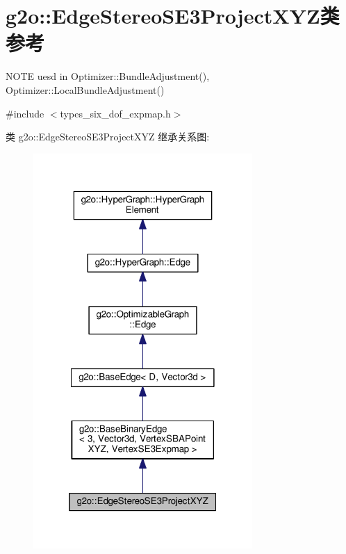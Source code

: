 \hypertarget{classg2o_1_1EdgeStereoSE3ProjectXYZ}{\section{g2o\-:\-:Edge\-Stereo\-S\-E3\-Project\-X\-Y\-Z类 参考}
\label{classg2o_1_1EdgeStereoSE3ProjectXYZ}
}


N\-O\-T\-E uesd in Optimizer\-::\-Bundle\-Adjustment(), Optimizer\-::\-Local\-Bundle\-Adjustment()  




{\ttfamily \#include $<$types\-\_\-six\-\_\-dof\-\_\-expmap.\-h$>$}



类 g2o\-:\-:Edge\-Stereo\-S\-E3\-Project\-X\-Y\-Z 继承关系图\-:
\nopagebreak
\begin{figure}[H]
\begin{center}
\leavevmode
\includegraphics[width=236pt]{classg2o_1_1EdgeStereoSE3ProjectXYZ__inherit__graph}
\end{center}
\end{figure}


